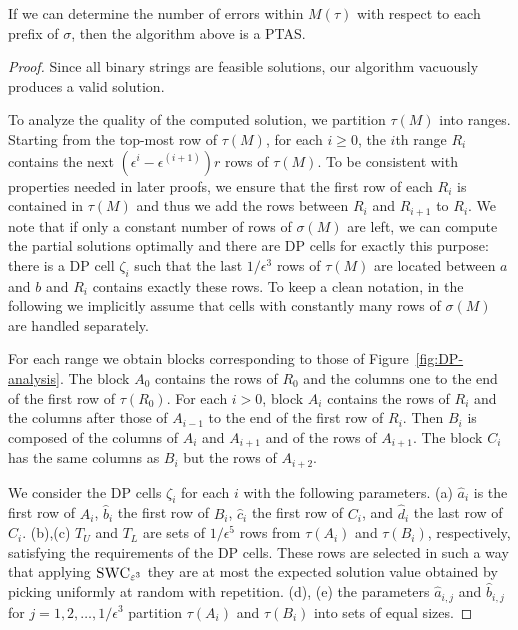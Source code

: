 \begin{lemma}\label{lem:simpleDP}
    If we can determine the number of errors within $M(\tau)$ with respect to each prefix of $\sigma$, then the algorithm above is a PTAS.
\end{lemma}
\begin{proof} 
    Since all binary strings are feasible solutions, our algorithm vacuously produces a valid solution. 

    To analyze the quality of the computed solution, we partition $\tau(M)$ into ranges.
    Starting from the top-most row of $\tau(M)$, for each $i \ge 0$, the $i$th range $R_i$ contains the next 
    $(\epsilon^{i} - \epsilon^{(i+1)})r$ rows of $\tau(M)$.
    To be consistent with properties needed in later proofs, we ensure that the first row of each $R_i$ is contained in $\tau(M)$ and thus
    we add the rows between $R_i$ and $R_{i+1}$ to $R_i$.
    We note that if only a constant number of rows of $\sigma(M)$ are left, we can compute the partial solutions optimally and
    there are DP cells for exactly this purpose:
    there is a DP cell $\zeta_i$ such that the last $1/\epsilon^3$ rows of $\tau(M)$ are located between $a$ and $b$ and $R_i$ contains exactly these rows.
    To keep a clean notation, in the following we implicitly assume that cells with constantly many rows of $\sigma(M)$ are handled separately.

    For each range we obtain blocks corresponding to those of Figure~\ref{fig:DP-analysis}.
    The block $A_0$ contains the rows of $R_0$ and the columns one to the end of the first row of $\tau(R_0)$. 
    For each $i > 0$, block $A_i$ contains the rows of $R_i$ and the columns after those of $A_{i-1}$ to the end of the first row of $R_i$.
    Then $B_i$ is composed of the columns of $A_i$ and $A_{i+1}$ and of the rows of $A_{i+1}$.
    The block $C_i$ has the same columns as $B_i$ but the rows of $A_{i+2}$.
    
    We consider the DP cells $\zeta_i$ for each $i$ with the following parameters.
    (a) $\hat{a}_i$ is the first row of $A_i$, $\hat{b}_i$ the first row of $B_i$, $\hat{c}_i$ the first row of $C_i$, and $\hat{d}_i$ the last row of $C_i$.
    (b),(c) $T_U$ and $T_L$ are  sets of $1/\epsilon^5$ rows from $\tau(A_i)$ and $\tau(B_i)$, respectively, satisfying the requirements of the DP cells.
    These rows are selected in such a way that applying $\textsc{SWC}_{\varepsilon^3}$ they are at most the expected solution value obtained by picking uniformly at random with repetition.
    (d), (e) the parameters $\hat{a}_{i,j}$ and $\hat{b}_{i,j}$ for $j = 1,2,\dotsc,1/\epsilon^3$ partition $\tau(A_i)$ and $\tau(B_i)$ into sets of equal sizes.


\end{proof}
